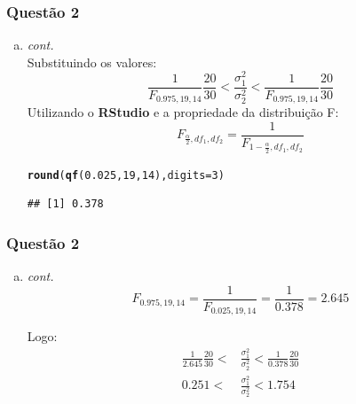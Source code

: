 \documentclass{beamer}\usepackage[]{graphicx}\usepackage[]{color}
\makeatletter
\newcommand{\hlnum}[1]{\textcolor[rgb]{0.686,0.059,0.569}{#1}}%
\newcommand{\hlstd}[1]{\textcolor[rgb]{0.345,0.345,0.345}{#1}}%
\newcommand{\hlkwc}[1]{\textcolor[rgb]{0.333,0.667,0.333}{#1}}%
\newcommand{\hlkwd}[1]{\textcolor[rgb]{0.737,0.353,0.396}{\textbf{#1}}}%
\newenvironment{kframe}{%
 \def\at@end@of@kframe{}%
 \ifinner\ifhmode%
  \def\at@end@of@kframe{\end{minipage}}%
  \begin{minipage}{\columnwidth}%
 \fi\fi%
 \def\FrameCommand##1{\hskip\@totalleftmargin \hskip-\fboxsep
 \colorbox{shadecolor}{##1}\hskip-\fboxsep
     \hskip-\linewidth \hskip-\@totalleftmargin \hskip\columnwidth}%
 \MakeFramed {\advance\hsize-\width
   \@totalleftmargin\z@ \linewidth\hsize
   \@setminipage}}%
 {\par\unskip\endMakeFramed%
 \at@end@of@kframe}
\newenvironment{knitrout}{}{} %
\makeatother
\begin{document}
	\begin{frame}[fragile]
		\frametitle{Questão 2}
		\begin{enumerate}[b)]
			\item \textit{cont.}\\
			Substituindo os valores:\\
			$$\frac{1}{F_{0.975,19,14}}\frac{20}{30} < \frac{\sigma_{1}^{2}}{\sigma_{2}^{2}} < \frac{1}{F_{0.975,19,14}}\frac{20}{30}$$
			Utilizando o \textbf{RStudio} e a propriedade da distribuição F:$$F_{\frac{\alpha}{2},df_{1},df_{2}} = \frac{1}{F_{1-\frac{\alpha}{2},df_{1},df_{2}}}$$
\begin{knitrout}
\color{fgcolor}\begin{kframe}
\begin{alltt}
\hlkwd{round}\hlstd{(}\hlkwd{qf}\hlstd{(}\hlnum{0.025}\hlstd{,}\hlnum{19}\hlstd{,}\hlnum{14}\hlstd{),}\hlkwc{digits} \hlstd{=} \hlnum{3}\hlstd{)}
\end{alltt}
\begin{verbatim}
## [1] 0.378
\end{verbatim}
\end{kframe}
\end{knitrout}
			
		\end{enumerate}
	\end{frame}
	
	\begin{frame}
		\frametitle{Questão 2}
		\begin{enumerate}[b)]
			\item \textit{cont.}\\
			$$F_{0.975,19,14} = \frac{1}{F_{0.025,19,14}} = \frac{1}{0.378} = 2.645$$
			
			Logo:
			\begin{align*}
				\frac{1}{2.645}\frac{20}{30} < &\frac{\sigma_{1}^{2}}{\sigma_{2}^{2}} < \frac{1}{0.378}\frac{20}{30}\\ 0.251 < &\frac{\sigma_{1}^{2}}{\sigma_{2}^{2}} < 1.754
			\end{align*}
		\end{enumerate}	
	\end{frame}
	
\end{document}
